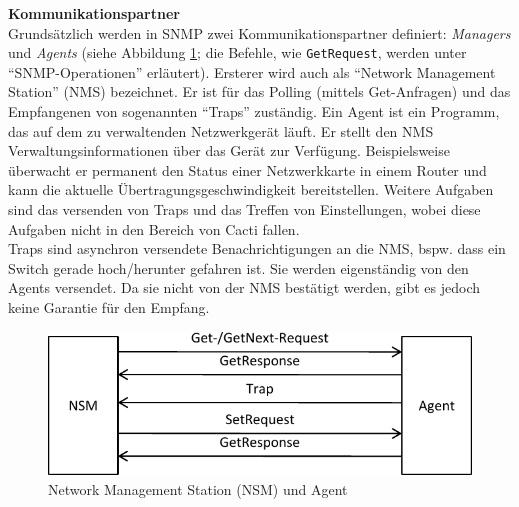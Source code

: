\documentclass[12pt,ngerman,toc=listofnumbered,toc=bibliographynumbered,toc=index,headsepline=true]{scrbook}
\begin{document}
\textbf{Kommunikationspartner}\\[1ex]
Grundsätzlich werden in SNMP zwei Kommunikationspartner definiert:
\textit{Managers} und \textit{Agents} (siehe Abbildung \ref{fig:manageragent};
die Befehle, wie \texttt{GetRequest}, werden unter \enquote{SNMP-Operationen}
erläutert).
Ersterer wird auch als \enquote{Network Management Station} (NMS) bezeichnet. Er
ist für das Polling (mittels Get-Anfragen) und das Empfangenen von sogenannten
\enquote{Traps} zuständig. Ein Agent ist ein Programm, das auf dem zu
verwaltenden Netzwerkgerät läuft. Er stellt den NMS Verwaltungsinformationen
über das Gerät zur Verfügung. Beispielsweise überwacht er permanent den Status
einer Netzwerkkarte in einem Router und kann die aktuelle
Übertragungsgeschwindigkeit bereitstellen. Weitere Aufgaben sind das versenden
von Traps und das Treffen von Einstellungen, wobei diese Aufgaben nicht in den
Bereich von Cacti fallen.\\
Traps sind asynchron versendete Benachrichtigungen an die NMS, bspw. dass ein
Switch gerade hoch/herunter gefahren ist. Sie werden eigenständig von den Agents
versendet. Da sie nicht von der NMS bestätigt werden, gibt es jedoch keine
Garantie für den Empfang.

\begin{figure}
	\centering
	\includegraphics{bilder/manageragent}
	\caption{Network Management Station (NSM) und Agent}
	\label{fig:manageragent}
\end{figure}
\end{document}
